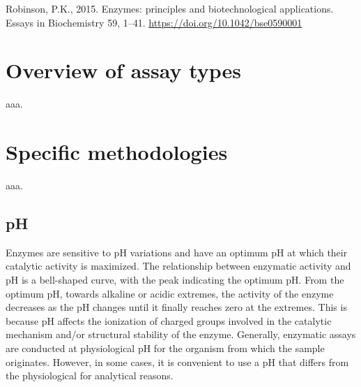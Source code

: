 \documentclass[
  9pt,
  american,
  a5paper,
  extrafontsizes,onecolumn,openright
  ]{memoir}
\begin{document}
Robinson, P.K., 2015. Enzymes: principles and biotechnological applications. Essays in Biochemistry 59, 1--41. \url{https://doi.org/10.1042/bse0590001}

\section{Overview of assay types}\label{overview-of-assay-types}

aaa.

\section{Specific methodologies}\label{specific-methodologies}

aaa.

\subsection{pH}\label{ph}

Enzymes are sensitive to pH variations and have an optimum pH at which their catalytic activity is maximized. The relationship between enzymatic activity and pH is a bell-shaped curve, with the peak indicating the optimum pH. From the optimum pH, towards alkaline or acidic extremes, the activity of the enzyme decreases as the pH changes until it finally reaches zero at the extremes. This is because pH affects the ionization of charged groups involved in the catalytic mechanism and/or structural stability of the enzyme. Generally, enzymatic assays are conducted at physiological pH for the organism from which the sample originates. However, in some cases, it is convenient to use a pH that differs from the physiological for analytical reasons.
\end{document}
